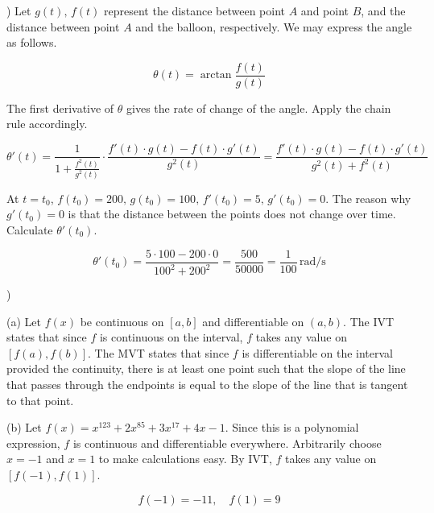 \documentclass{article}
\begin{document}
\hfill

) Let $g(t),\,f(t)$ represent the distance between point $A$ and point $B$, and the distance between point $A$ and the balloon, respectively. We may express the angle as follows.

\begin{equation*}\theta(t)=\arctan{\frac{f(t)}{g(t)}}\end{equation*}

\hfill

\noindent The first derivative of $\theta$ gives the rate of change of the angle. Apply the chain rule accordingly.

\begin{equation*}\theta'(t)=\frac1{\displaystyle 1+\frac{f^2(t)}{g^2(t)}}\cdot\frac{f'(t)\cdot g(t) - f(t) \cdot g'(t)}{g^2(t)}=\frac{f'(t)\cdot g(t) - f(t) \cdot g'(t)}{g^2(t)+f^2(t)}\end{equation*}

\hfill

\noindent At $t=t_0$, $f(t_0)= 200,\,g(t_0) =100,\,f'(t_0)=5,\,g'(t_0) = 0$. The reason why $g'(t_0) = 0$ is that the distance between the points does not change over time. Calculate $\theta'(t_0)$.

\begin{equation*}\theta'(t_0)=\frac{5\cdot 100 - 200 \cdot 0}{100^2+200^2}=\frac{500}{50000}=\boxed{\frac1{100}\,\mathrm{rad/s}} \end{equation*}

\hfill

)

\hfill

\noindent (a) Let $f(x)$ be continuous on $[a,b]$ and differentiable on $(a,b)$. The IVT states that since $f$ is continuous on the interval, $f$ takes any value on $[f(a), f(b)]$. The MVT states that since $f$ is differentiable on the interval provided the continuity, there is at least one point such that the slope of the line that passes through the endpoints is equal to the slope of the line that is tangent to that point.

\hfill

\noindent (b) Let $f(x) = x^{123}+2x^{85} + 3x^{17} + 4x-1$. Since this is a polynomial expression, $f$ is continuous and differentiable everywhere. Arbitrarily choose $x=-1$ and $x=1$ to make calculations easy. By IVT, $f$ takes any value on $[f(-1), f(1)]$.

\begin{equation*}f(-1) = -11,\quad f(1) =9\end{equation*}
\end{document}
